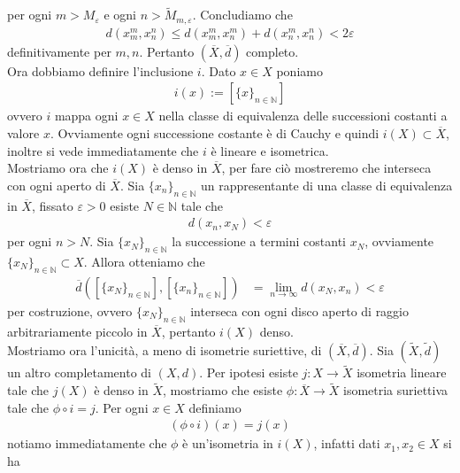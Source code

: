\documentclass{article}
\numberwithin{equation}{subsection}
\begin{document}
per ogni $m > M_\varepsilon$ e ogni $n > \widetilde{M}_{m, \varepsilon}$. Concludiamo che
\begin{align*}
    d(x^m_m, x^n_n) \leq d(x^m_m, x^m_n) + d(x^m_n, x^n_n) < 2\varepsilon
\end{align*}
definitivamente per $m, n$. Pertanto $(\overline{X}, \overline{d})$ completo. \\
Ora dobbiamo definire l'inclusione $i$. Dato $x \in X$ poniamo 
\begin{align*}
    i(x) := [\{x\}_{n \in \mathbb{N}}] 
\end{align*}
ovvero $i$ mappa ogni $x \in X$ nella classe di equivalenza delle successioni costanti a valore $x$. Ovviamente ogni successione costante è di Cauchy e quindi $i(X) \subset \overline{X}$, inoltre si vede immediatamente che $i$ è lineare e isometrica. \\
Mostriamo ora che $i(X)$ è denso in $\overline{X}$, per fare ciò mostreremo che interseca con ogni aperto di $\overline{X}$. Sia $\{x_n\}_{n \in \mathbb{N}}$ un rappresentante di una classe di equivalenza in $\overline{X}$, fissato $\varepsilon > 0$ esiste $N \in \mathbb{N}$ tale che 
\begin{align*}
    d(x_n, x_N) < \varepsilon 
\end{align*}
per ogni $n > N$. Sia $\{x_N\}_{n \in \mathbb{N}}$ la successione a termini costanti $x_N$, ovviamente $\{x_N\}_{n \in \mathbb{N}} \subset X$. Allora otteniamo che 
\begin{align*}
    \overline{d}([\{x_N\}_{n \in \mathbb{N}}], [\{x_n\}_{n \in \mathbb{N}}]) &= \lim_{n \rightarrow \infty}d(x_N, x_n) < \varepsilon 
\end{align*}
per costruzione, ovvero $\{x_N\}_{n \in \mathbb{N}}$ interseca con ogni disco aperto di raggio arbitrariamente piccolo in $\overline{X}$, pertanto $i(X)$ denso. \\
Mostriamo ora l'unicità, a meno di isometrie suriettive, di $(\overline{X}, \overline{d})$. Sia $(\widetilde{X}, \tilde{d})$ un altro completamento di $(X, d)$.
Per ipotesi esiste $j : X \longrightarrow \widetilde{X}$ isometria lineare tale che $j(X)$ è denso in $\widetilde{X}$, mostriamo che esiste $\phi : \overline{X} \longrightarrow \widetilde{X}$ isometria suriettiva tale che $\phi \circ i = j$. Per ogni $x \in X$ definiamo 
\begin{align*}
    (\phi \circ i)(x) = j(x) 
\end{align*}
notiamo immediatamente che $\phi$ è un'isometria in $i(X)$, infatti dati $x_1, x_2 \in X$ si ha 
\end{document}
